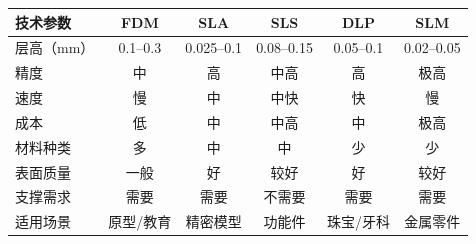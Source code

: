 \documentclass[12pt,UTF8]{ctexbook}
\begin{document}
\begin{center}
\begin{tabular}{|l|c|c|c|c|c|}
\hline
\textbf{技术参数} & \textbf{FDM} & \textbf{SLA} & \textbf{SLS} & \textbf{DLP} & \textbf{SLM} \\
\hline
层高（mm） & 0.1--0.3 & 0.025--0.1 & 0.08--0.15 & 0.05--0.1 & 0.02--0.05 \\
\hline
精度 & 中 & 高 & 中高 & 高 & 极高 \\
\hline
速度 & 慢 & 中 & 中快 & 快 & 慢 \\
\hline
成本 & 低 & 中 & 中高 & 中 & 极高 \\
\hline
材料种类 & 多 & 中 & 中 & 少 & 少 \\
\hline
表面质量 & 一般 & 好 & 较好 & 好 & 较好 \\
\hline
支撑需求 & 需要 & 需要 & 不需要 & 需要 & 需要 \\
\hline
适用场景 & 原型/教育 & 精密模型 & 功能件 & 珠宝/牙科 & 金属零件 \\
\hline
\end{tabular}
\end{center}
\end{document}
